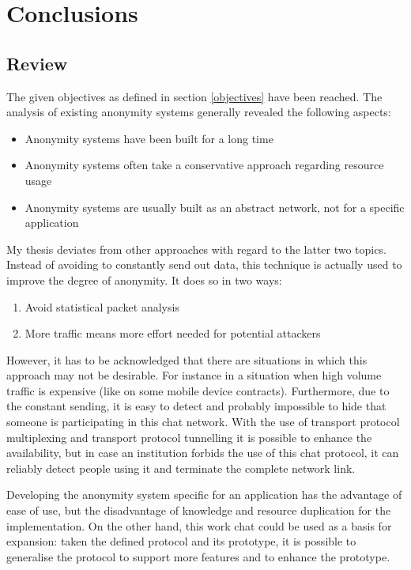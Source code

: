 \chapter{Conclusions}
\section{Review}
The given objectives as defined in section
\ref{objectives} have been reached. 
The analysis of existing anonymity systems generally revealed the
following aspects:
\begin{itemize}
\item Anonymity systems have been built for a long time
\item Anonymity systems often take a conservative approach regarding resource usage
\item Anonymity systems are usually built as an abstract network, not for a specific application
\end{itemize}
My thesis deviates from other approaches with regard to the latter two topics.
Instead of avoiding to constantly send out data, this technique is actually
used to improve the degree of anonymity. It does so in two ways:
\begin{enumerate}
\item Avoid statistical packet analysis
\item More traffic means more effort needed for potential attackers
\end{enumerate}
However, it has to be acknowledged that there are situations
in which this approach may not be desirable.
For instance in a situation when high volume traffic is expensive
(like on some mobile device contracts).
Furthermore, due to the constant sending, it is easy to detect and probably
impossible to hide that someone is participating in this chat network.
With the use of transport protocol multiplexing and transport protocol
tunnelling it is possible to enhance the availability, but in case an
institution forbids the use of this chat protocol, it can reliably
detect people using it and terminate the complete network link.

Developing the anonymity system specific for an application has the advantage
of ease of use, but the disadvantage of knowledge and resource duplication
for the implementation. On the other hand, this work
chat could be used as a basis for expansion: taken the
defined protocol and its prototype, it is possible to generalise
the protocol to support more features and to enhance the prototype.
